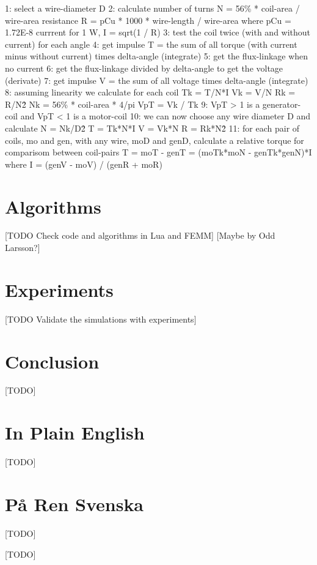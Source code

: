 \documentclass[]{elementary-physics}
\begin{document}
 1: select a wire-diameter D
 2: calculate 
    number of turns N = 56\% * coil-area / wire-area
    resistance R = pCu * 1000 * wire-length / wire-area 
      where pCu = 1.72E-8
    currrent for 1 W, I = sqrt(1 / R)
 3: test the coil twice (with and without current) for each angle
 4: get impulse T = the sum of all torque (with current minus without current) times delta-angle (integrate)
 5: get the flux-linkage when no current
 6: get the flux-linkage divided by delta-angle to get the voltage (derivate)
 7: get impulse V = the sum of all voltage times delta-angle (integrate)
 8: assuming linearity we calculate for each coil
    Tk = T/N*I
    Vk = V/N
    Rk = R/N\^2
    Nk = 56\% * coil-area * 4/pi
    VpT = Vk / Tk
 9: VpT > 1 is a generator-coil and VpT < 1 is a motor-coil
10: we can now choose any wire diameter D and calculate
    N = Nk/D\^2
    T = Tk*N*I
    V = Vk*N
    R = Rk*N\^2
11: for each pair of coils, mo and gen, with any wire, moD and genD, calculate a relative torque for comparisom between coil-pairs
    T = moT - genT = (moTk*moN - genTk*genN)*I
      where I = (genV - moV) / (genR + moR)



\section{Algorithms}

[TODO Check code and algorithms in Lua and FEMM]
[Maybe by Odd Larsson?]

\section{Experiments}

[TODO Validate the simulations with experiments]

\section{Conclusion}

[TODO]

\appendix

\section{In Plain English}

[TODO]

\section{På Ren Svenska}

[TODO]



[TODO]

\printbibliography
\end{document}
